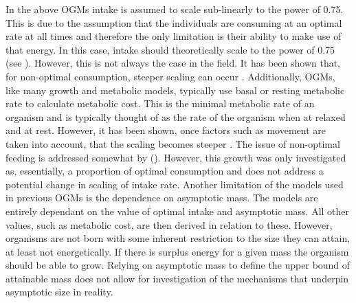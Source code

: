 \documentclass[a4paper, 11pt, hidelinks]{article} %
\begin{document}
	

	In the above OGMs intake is assumed to scale sub-linearly to the power of 0.75.  This is due to the assumption that the individuals are consuming at an optimal rate at all times and therefore the only limitation is their ability to make use of that energy.  In this case, intake should theoretically scale to the power of 0.75 (see \cite{West1997}).  However, this is not always the case in the field.  It has been shown that, for non-optimal consumption, steeper scaling can occur \parencite{Pawar2012, Peters1983}. Additionally, OGMs, like many growth and metabolic models, typically use basal or resting metabolic rate to calculate metabolic cost.  This is the minimal metabolic rate of an organism and is typically thought of as the rate of the organism when at relaxed and at rest.  However, it has been shown, once factors such as movement are taken into account, that the scaling becomes steeper \parencite{Weibel2004}.
	The issue of non-optimal feeding is addressed somewhat by \citeauthor{Hou2011} (\citeyear{Hou2011}).  However, this growth was only investigated as, essentially, a proportion of optimal consumption and does not address a potential change in scaling of intake rate.
	Another limitation of the models used in previous OGMs is the dependence on asymptotic mass.  The models are entirely dependant on the value of optimal intake and asymptotic mass.  All other values, such as metabolic cost, are then derived in relation to these.  However, organisms are not born with some inherent restriction to the size they can attain, at least not energetically.  If there is surplus energy for a given mass the organism should be able to grow.  Relying on asymptotic mass to define the upper bound of attainable mass does not allow for investigation of the mechanisms that underpin asymptotic size in reality. 
	
\end{document}
